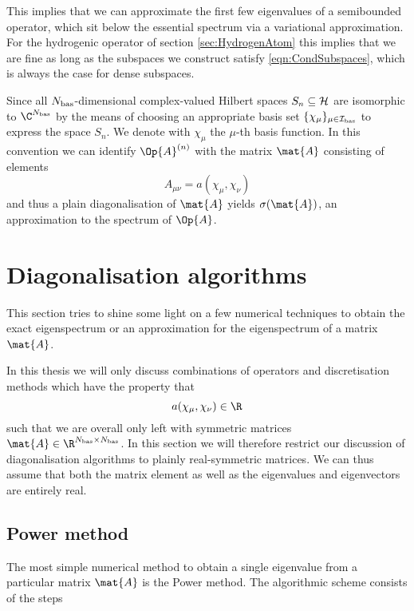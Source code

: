 This implies that we can approximate the first few eigenvalues
of a semibounded operator,
which sit below the essential spectrum via a variational approximation.
For the hydrogenic operator of section \vref{sec:HydrogenAtom}
this implies that we are fine
as long as the subspaces we construct satisfy \eqref{eqn:CondSubspaces},
which is always the case for dense subspaces.

Since all $N_\text{bas}$-dimensional complex-valued Hilbert spaces $S_n \subseteq \mathcal{H}$
are isomorphic to $\C^{\Nbas}$ by the means of choosing an appropriate
basis set $\{\chi_\mu\}_{\mu \in \mathcal{I}_\text{bas}}$ to express the space $S_n$.
We denote with $\chi_\mu$ the $\mu$-th basis function.
In this convention we can identify $\Op{A}^{(n)}$ with the matrix $\mat{A}$
consisting of elements
\[ A_{\mu\nu} = a(\chi_\mu, \chi_\nu) \]
and thus a plain diagonalisation of $\mat{A}$ yields $\sigma(\mat{A})$,
an approximation to the spectrum of $\Op{A}$.


\section{Diagonalisation algorithms}
This section tries to shine some light on a few numerical techniques
to obtain the exact eigenspectrum or an approximation for the eigenspectrum
of a matrix $\mat{A}$.

In this thesis we will only discuss combinations of operators
and discretisation methods which have the property
that
\[ a(\chi_\mu, \chi_\nu) \in \R \]
such that we are overall only left with symmetric matrices
$\mat{A} \in \R^{\Nbas \times \Nbas}$.
In this section we will therefore restrict our discussion
of diagonalisation algorithms to plainly real-symmetric matrices.
We can thus assume that both the matrix element
as well as the eigenvalues and eigenvectors are entirely real.

\subsection{Power method}
The most simple numerical method to obtain
a single eigenvalue from a particular matrix $\mat{A}$
is the Power method.
The algorithmic scheme consists of the steps

